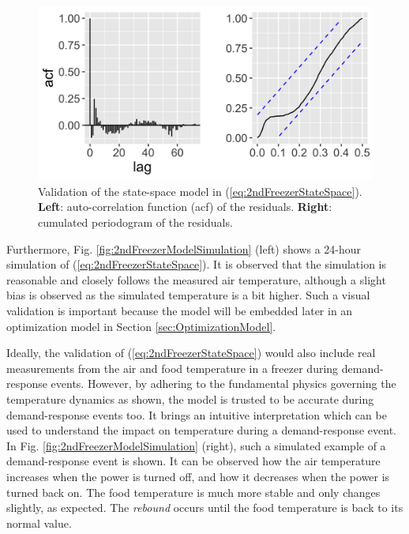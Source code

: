 \begin{figure}[!t]
    \centering
    \includegraphics[width=\columnwidth]{../figures/2ndFreezerModelValidation.png}
    \caption{ Validation of the state-space model in (\ref{eq:2ndFreezerStateSpace}). \textbf{Left}: auto-correlation function (acf) of the  residuals. \textbf{Right}: cumulated periodogram of the residuals.}
    \label{fig:2ndFreezerModelValidation}
    \vspace{-1mm}
\end{figure}



Furthermore, Fig. \ref{fig:2ndFreezerModelSimulation} (left) shows a 24-hour simulation of  (\ref{eq:2ndFreezerStateSpace}). It is observed that the simulation is  reasonable and closely follows the measured air temperature, although a slight bias is observed as the simulated temperature is a bit higher. Such a visual validation is important because the model will be embedded later in an optimization model in Section \ref{sec:OptimizationModel}.

Ideally, the validation of (\ref{eq:2ndFreezerStateSpace}) would also include real measurements from the air and food temperature in a freezer during demand-response events. However, by adhering to the fundamental physics governing the temperature dynamics as shown, the model is trusted to be accurate during demand-response events too. It brings an intuitive interpretation which can be used to understand the impact on temperature during a demand-response event.
In Fig. \ref{fig:2ndFreezerModelSimulation} (right), such a simulated example of a demand-response event is shown. It can be observed how the air temperature increases when the power is turned off, and how it decreases when the power is turned back on. The food temperature is much more stable and only changes slightly, as expected. The \textit{rebound} occurs until the food temperature is back to its normal value.

